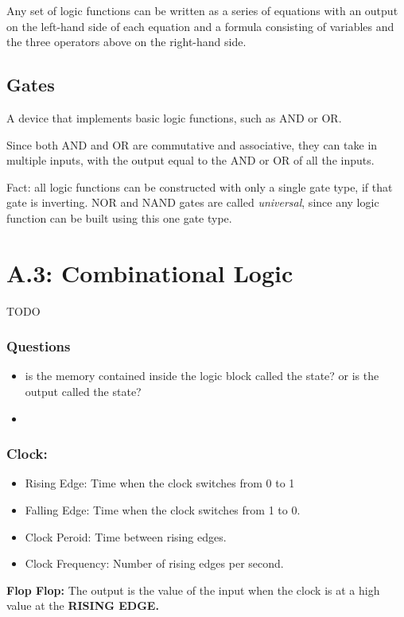 \documentclass[12pt]{article}
\begin{document}
Any set of logic functions can be written as a series of equations with an output on the left-hand side of each equation and a formula consisting of variables and the three operators above on the right-hand side.

\subsection*{Gates}
A device that implements basic logic functions, such as AND or OR.

Since both AND and OR are commutative and associative, they can take in multiple inputs, with the output equal to the AND or OR of all the inputs.

Fact: all logic functions can be constructed with only a single gate type, if that gate is inverting. NOR and NAND gates are called \emph{universal}, since any logic function can be built using this one gate type.

\section*{A.3: Combinational Logic}
 {\color{red} TODO}


\subsubsection*{Questions}
\begin{itemize}
    \item is the memory contained inside the logic block called the state? or is the output called the state?
    \item
\end{itemize}


\subsubsection*{Clock:}
\begin{itemize}
    \item Rising Edge: Time when the clock switches from 0 to 1
    \item Falling Edge: Time when the clock switches from 1 to 0.
    \item Clock Peroid: Time between rising edges.
    \item Clock Frequency: Number of rising edges per second.
\end{itemize}

\textbf{Flop Flop:}
The output is the value of the input when the clock is at a high value at the \textbf{RISING EDGE.}
\end{document}
